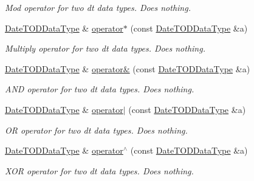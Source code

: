\begin{DoxyCompactItemize}
\begin{DoxyCompactList}\small\item\em Mod operator for two dt data types. Does nothing. \end{DoxyCompactList}\item 
\hyperlink{structpc__emulator_1_1DateTODDataType}{Date\+T\+O\+D\+Data\+Type} \& \hyperlink{structpc__emulator_1_1DateTODDataType_a1663a50decfc0ab9d6313256aca42034}{operator$\ast$} (const \hyperlink{structpc__emulator_1_1DateTODDataType}{Date\+T\+O\+D\+Data\+Type} \&a)\hypertarget{structpc__emulator_1_1DateTODDataType_a1663a50decfc0ab9d6313256aca42034}{}\label{structpc__emulator_1_1DateTODDataType_a1663a50decfc0ab9d6313256aca42034}

\begin{DoxyCompactList}\small\item\em Multiply operator for two dt data types. Does nothing. \end{DoxyCompactList}\item 
\hyperlink{structpc__emulator_1_1DateTODDataType}{Date\+T\+O\+D\+Data\+Type} \& \hyperlink{structpc__emulator_1_1DateTODDataType_ab666f2a21b8ea87cd487e736c21bcf9d}{operator\&} (const \hyperlink{structpc__emulator_1_1DateTODDataType}{Date\+T\+O\+D\+Data\+Type} \&a)\hypertarget{structpc__emulator_1_1DateTODDataType_ab666f2a21b8ea87cd487e736c21bcf9d}{}\label{structpc__emulator_1_1DateTODDataType_ab666f2a21b8ea87cd487e736c21bcf9d}

\begin{DoxyCompactList}\small\item\em A\+ND operator for two dt data types. Does nothing. \end{DoxyCompactList}\item 
\hyperlink{structpc__emulator_1_1DateTODDataType}{Date\+T\+O\+D\+Data\+Type} \& \hyperlink{structpc__emulator_1_1DateTODDataType_a94d092afaa9a2dca6c650d6049cb9b35}{operator$\vert$} (const \hyperlink{structpc__emulator_1_1DateTODDataType}{Date\+T\+O\+D\+Data\+Type} \&a)\hypertarget{structpc__emulator_1_1DateTODDataType_a94d092afaa9a2dca6c650d6049cb9b35}{}\label{structpc__emulator_1_1DateTODDataType_a94d092afaa9a2dca6c650d6049cb9b35}

\begin{DoxyCompactList}\small\item\em OR operator for two dt data types. Does nothing. \end{DoxyCompactList}\item 
\hyperlink{structpc__emulator_1_1DateTODDataType}{Date\+T\+O\+D\+Data\+Type} \& \hyperlink{structpc__emulator_1_1DateTODDataType_a5332d6081bea88bcfad6477f39361bc7}{operator$^\wedge$} (const \hyperlink{structpc__emulator_1_1DateTODDataType}{Date\+T\+O\+D\+Data\+Type} \&a)\hypertarget{structpc__emulator_1_1DateTODDataType_a5332d6081bea88bcfad6477f39361bc7}{}\label{structpc__emulator_1_1DateTODDataType_a5332d6081bea88bcfad6477f39361bc7}

\begin{DoxyCompactList}\small\item\em X\+OR operator for two dt data types. Does nothing. \end{DoxyCompactList}\end{DoxyCompactItemize}
